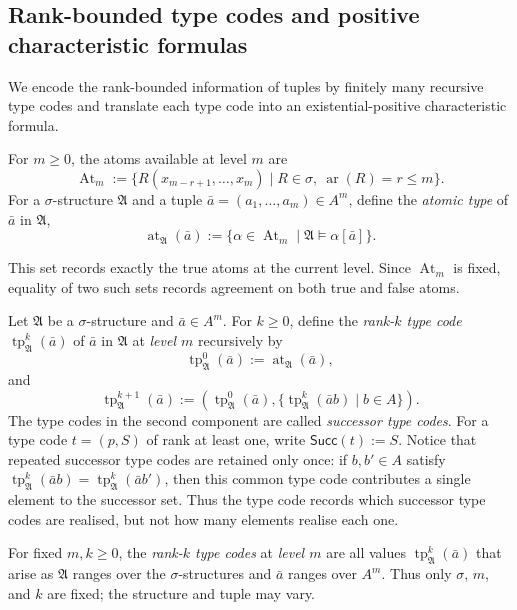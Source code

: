 \documentclass{lmcs}
\newcommand{\At}{\operatorname{At}}
\newcommand{\at}{\operatorname{at}}
\newcommand{\tp}{\operatorname{tp}}
\newcommand{\A}{\mathfrak{A}}
\begin{document}
\subsection{Rank-bounded type codes and positive characteristic formulas}\label{sec:types}
We encode the rank-bounded information of tuples by finitely many
recursive type codes and translate each type code into an existential-positive
characteristic formula.
\begin{defi}\label{def:atomic-type}
For $m\geq0$, the atoms available at level $m$ are
\[
  \At_m
  :=
  \bigl\{
     R(x_{m-r+1},\ldots,x_m)\mid
     R\in\sigma,\ \operatorname{ar}(R)=r\leq m
  \bigr\}.
\]
For a $\sigma$-structure $\A$ and a tuple
$\bar a=(a_1,\ldots,a_m)\in A^m$, define the \emph{atomic type} of $\bar a$ in
$\A$,
\[
  \at_{\A}(\bar a)
  :=
  \bigl\{
      \alpha\in\At_m\mid
      \A\models\alpha[\bar a]
  \bigr\}.
\]
\end{defi}

This set records exactly the true atoms at the current level.  Since $\At_m$
is fixed, equality of two such sets records agreement on both true and false
atoms.

\begin{defi}\label{def:type-code}
Let $\A$ be a $\sigma$-structure and $\bar a\in A^m$.  For $k\geq0$, define
the \emph{rank-$k$ type code} $\tp_{\A}^k(\bar a)$ of $\bar a$ in $\A$ at
\emph{level $m$} recursively by
\[
  \tp_{\A}^{0}(\bar a)
  :=
  \at_{\A}(\bar a),
\]
and
\begin{equation}
  \tp_{\A}^{k+1}(\bar a)
  :=
  \left(
     \tp_{\A}^{0}(\bar a),
     \bigl\{
       \tp_{\A}^{k}(\bar a b)\mid b\in A
     \bigr\}
  \right).
  \label{eq:type-code}
\end{equation}
The type codes in the second component are called \emph{successor type codes}.
For a type code $t=(p,S)$ of rank at least one, write
$\mathsf{Succ}(t):=S$.
Notice that repeated successor type codes are retained only once: if $b,b'\in A$ satisfy
$\tp_{\A}^{k}(\bar a b)=\tp_{\A}^{k}(\bar a b')$, then this common type code
contributes a single element to the successor set.  Thus the type code records
which successor type codes are realised, but not how many elements realise each
one.
\end{defi}

For fixed $m,k\geq0$, the \emph{rank-$k$ type codes} at \emph{level $m$} are
all values $\tp_{\A}^k(\bar a)$ that arise as $\A$ ranges over the $\sigma$-structures
and $\bar a$ ranges over $A^m$.  Thus only $\sigma$, $m$, and $k$ are fixed;
the structure and tuple may vary.
\end{document}
